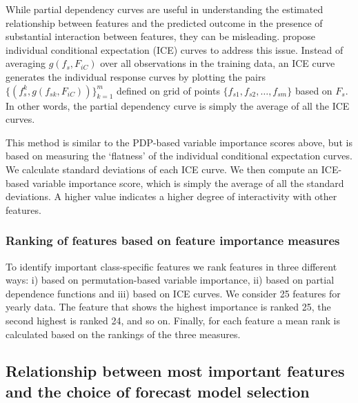 \documentclass[11pt,a4paper,]{article}
\begin{document}
While partial dependency curves are useful in understanding the estimated relationship between features and the predicted outcome in the presence of substantial interaction between features, they can be misleading. \textcite{goldstein2015peeking} propose individual conditional expectation (ICE) curves to address this issue. Instead of
averaging \(g(f_s, F_{iC})\) over all observations in the training data, an ICE curve generates the individual response curves by plotting the pairs \(\{(f_s^k, g(f_{sk}, F_{iC}))\}_{k=1}^{m}\) defined on grid of points \(\{f_{s1}, f_{s2},\dots, f_{sm}\}\) based on \(F_s\). In other words, the partial dependency curve is simply the average of all the ICE curves.

This method is similar to the PDP-based variable importance scores above, but is based on measuring the `flatness' of the individual conditional expectation curves. We calculate standard deviations of each ICE curve. We then compute an ICE-based variable importance score, which is simply the average of all the standard deviations. A higher value indicates a higher degree of interactivity with other features.

\hypertarget{ranking-of-features-based-on-feature-importance-measures}{%
\subsubsection{Ranking of features based on feature importance measures}\label{ranking-of-features-based-on-feature-importance-measures}}

To identify important class-specific features we rank features in three different ways: i) based on permutation-based variable importance, ii) based on partial dependence functions and iii) based on ICE curves. We consider 25 features for yearly data. The feature that shows the highest importance is ranked 25, the second highest is ranked 24, and so on. Finally, for each feature a mean rank is calculated based on the rankings of the three measures.

\hypertarget{relationship-between-most-important-features-and-the-choice-of-forecast-model-selection}{%
\subsection{Relationship between most important features and the choice of forecast model selection}\label{relationship-between-most-important-features-and-the-choice-of-forecast-model-selection}}
\end{document}

